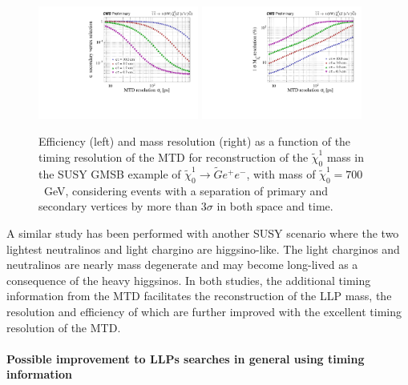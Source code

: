 \begin{figure}[t]\begin{center}
\includegraphics[width=0.47\textwidth]{figures/MTD/171025_52.pdf}
\includegraphics[width=0.47\textwidth]{figures/MTD/171025_53.pdf}
\caption{ 
Efficiency (left) and mass resolution (right) as a function of the timing resolution of the MTD for reconstruction of the $\tilde{\chi}_0^1$ mass in the SUSY GMSB example of $\tilde{\chi}_0^1 \to \tilde{G} e^{+} e^{-}$, with mass of $\tilde{\chi}_0^1=700$~GeV, considering events with a separation of primary and secondary vertices by more than $3\sigma$ in both space and time.
}
\label{fig:cmsupgrade_mtd}
\end{center}
\end{figure}

A similar study has been performed with another SUSY scenario where the two lightest neutralinos and light chargino are higgsino-like. The light charginos and neutralinos are nearly mass degenerate and may become long-lived as a consequence of the heavy higgsinos. In both studies, the additional timing information from the MTD facilitates the reconstruction of the LLP mass, the resolution and efficiency of which are further improved with the excellent timing resolution of the MTD.

\noindent {\bf \textcolor{red}{[JB: Can we add a brief, unambiguous statement about whether the upgrade will provide improvement?]}}

\noindent {\bf \textcolor{red}{[BS: Are there any results for the Higgsino example? Should we just leave it out?]}}

\paragraph{Possible improvement to LLPs searches in general using timing information}

